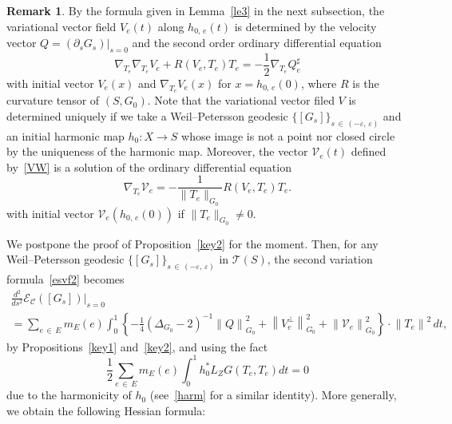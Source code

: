 \documentclass[11pt]{article}
\theoremstyle{definition}
\newtheorem{rema}[theo]{Remark}
\numberwithin{equation}{section}
\newcommand{\e}{\varepsilon}
\newcommand{\p}{\psi}
\newcommand{\Cc}{\mathcal{C}}
\newcommand{\Ec}{\mathcal{E}}
\newcommand{\Tc}{\mathcal{T}}
\newcommand*\Vc{\mathcal{V}}
\renewcommand*\p{\partial}
\begin{document}
\begin{rema}
By the formula given in Lemma~\ref{le3} in the next subsection, the variational vector field $V_e(t)$ along $h_{0,\,e}(t)$ is determined by the velocity vector $Q=(\p_sG_s)|_{s=0}$ and the second order ordinary differential equation
\begin{equation}\label{deqv1}
\nabla_{T_e}\nabla_{T_e}V_e+R\left(V_e, T_e\right)T_e=-\frac{1}{2}\nabla_{T_e}Q_e^{\sharp}
\end{equation}
with initial vector $V_e(x)$ and $\nabla_{T_e}V_e(x)$ for $x=h_{0,\,e}(0)$, where $R$ is the curvature tensor of $(S,G_0)$. Note that the variational vector filed $V$ is determined uniquely if we take a Weil--Petersson geodesic $\{[G_s]\}_{s\,\in\,(-\e, \,\e)}$ and an initial harmonic map $h_0: X\to S$ whose image is not a point nor closed circle by the uniqueness of the harmonic map. Moreover, the vector $\Vc_e(t)$ defined by~\eqref{VW} is a solution of the ordinary differential equation
\begin{equation}\label{deqv2}
\nabla_{T_e}\Vc_e=-\frac{1}{\|T_e\|_{G_0}}R\left(V_e,T_e\right)T_e.
\end{equation}
with initial vector $\Vc_e(h_{0,\,e}(0))$ if $\|T_e\|_{G_0}\neq 0$.
\end{rema}




We postpone the proof of Proposition~\ref{key2} for the moment. Then, for any Weil--Petersson geodesic $\{[G_s]\}_{s\,\in \,(-\e,\,\e)}$ in $\Tc(S)$, the second variation formula~\eqref{esvf2} becomes
\begin{multline}\label{svff}
\frac{d^2}{d s^2}\Ec_{\Cc}\left([G_{s}]\right)\bigg|_{s=0}\\
=\sum_{e\,\in\,E}m_E(e)\int_0^1\left\{-\frac{1}{4}\left(\Delta_{G_0}-2\right)^{-1}\left\|Q\right\|_{G_0}^2+\left\|V_e^{\perp}\right\|_{G_0}^2+\left\|\Vc_e\right\|_{G_0}^2\right\}\cdot \left\|T_e\right\|^2\,dt,
\end{multline}
by Propositions~\ref{key1} and~\ref{key2}, and using the fact
\[
\frac{1}{2}\sum_{e\,\in\,E}m_E(e)\int_0^1 h_0^*L_ZG\left(T_e,T_e\right)dt=0
\]
due to the harmonicity of $h_0$ (see~\eqref{harm} for a similar identity). More generally, we obtain the following Hessian formula:
\end{document}
